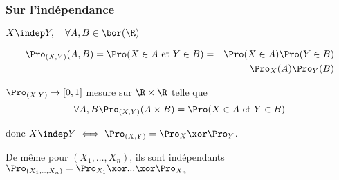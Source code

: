 \subsubsection{Sur l'indépendance}

$X \indep Y, \quad \forall A,B \in \bor (\R)$

\begin{eqnarray*}
	\Pro_{(X,Y)}(A,B)= \Pro (X \in A \text{ et } Y \in B)
	&=& \Pro(X\in A) \Pro(Y\in B)\\
	&=& \Pro_X(A) \Pro_Y( B)
\end{eqnarray*}


$\Pro_{(X,Y)} \to [0,1]$ mesure sur $\R \times \R$ telle que
$$\forall A,B\Pro_{(X,Y)}(A\times B) = \Pro (X\in A \text{ et } Y \in B)$$

donc $X \indep Y\iff \Pro_{(X,Y)} = \Pro_X \xor \Pro_Y$.

De même pour $(X_1, \dots, X_n)$, ils sont indépendants \ssi $\Pro_{(X_1,.., X_n)} =\Pro_{X_1} \xor ... \xor  \Pro_{X_n} $

